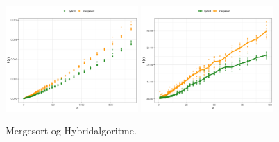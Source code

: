 \begin{figure}
	\begin{center}
		\includegraphics[width=0.45\textwidth]{../img/toMergesort.png}
		\includegraphics[width=0.45\textwidth]{../img/toMergesortZoomed.png}
	\end{center}
	\caption{Mergesort og Hybridalgoritme.}
	\label{fig:Mergesort og Hybridalgoritme}
\end{figure}

